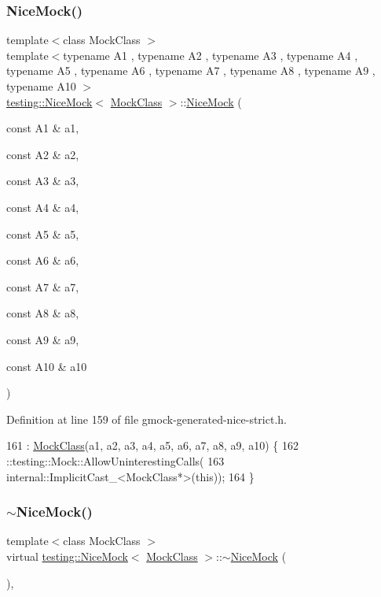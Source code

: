 \subsubsection{\texorpdfstring{Nice\+Mock()}{NiceMock()}\hspace{0.1cm}{\footnotesize\ttfamily [11/11]}}
{\footnotesize\ttfamily template$<$class Mock\+Class $>$ \\
template$<$typename A1 , typename A2 , typename A3 , typename A4 , typename A5 , typename A6 , typename A7 , typename A8 , typename A9 , typename A10 $>$ \\
\hyperlink{classtesting_1_1NiceMock}{testing\+::\+Nice\+Mock}$<$ \hyperlink{classMockClass}{Mock\+Class} $>$\+::\hyperlink{classtesting_1_1NiceMock}{Nice\+Mock} (\begin{DoxyParamCaption}\item[{const A1 \&}]{a1,  }\item[{const A2 \&}]{a2,  }\item[{const A3 \&}]{a3,  }\item[{const A4 \&}]{a4,  }\item[{const A5 \&}]{a5,  }\item[{const A6 \&}]{a6,  }\item[{const A7 \&}]{a7,  }\item[{const A8 \&}]{a8,  }\item[{const A9 \&}]{a9,  }\item[{const A10 \&}]{a10 }\end{DoxyParamCaption})\hspace{0.3cm}{\ttfamily [inline]}}



Definition at line 159 of file gmock-\/generated-\/nice-\/strict.\+h.


\begin{DoxyCode}
161                       : \hyperlink{classMockClass}{MockClass}(a1, a2, a3, a4, a5, a6, a7, a8, a9, a10) \{
162     ::testing::Mock::AllowUninterestingCalls(
163         internal::ImplicitCast\_<MockClass*>(\textcolor{keyword}{this}));
164   \}
\end{DoxyCode}
\mbox{\label{classtesting_1_1NiceMock_a4aaa6bd3850de6b6baa408010909a25f}} 
\subsubsection{\texorpdfstring{$\sim$\+Nice\+Mock()}{~NiceMock()}}
{\footnotesize\ttfamily template$<$class Mock\+Class $>$ \\
virtual \hyperlink{classtesting_1_1NiceMock}{testing\+::\+Nice\+Mock}$<$ \hyperlink{classMockClass}{Mock\+Class} $>$\+::$\sim$\hyperlink{classtesting_1_1NiceMock}{Nice\+Mock} (\begin{DoxyParamCaption}{ }\end{DoxyParamCaption})\hspace{0.3cm}{\ttfamily [inline]}, {\ttfamily [virtual]}}



